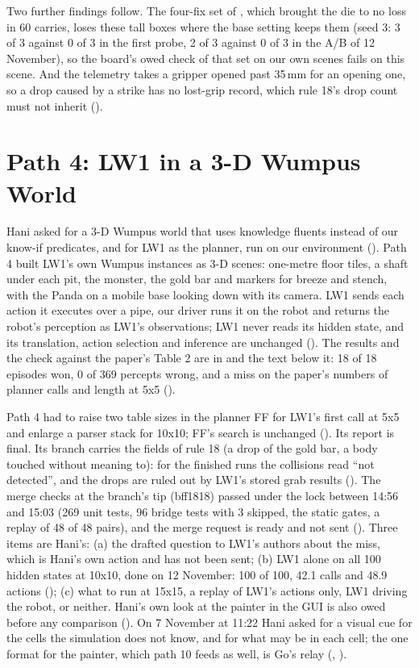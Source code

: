 Two further findings follow. The four-fix set of , which brought the die to no
loss in 60 carries, loses these tall boxes where the base setting keeps them (seed 3:
3 of 3 against 0 of 3 in the first probe, 2 of 3 against 0 of 3 in the A/B of 12
November), so the board's owed check of that set on our own scenes fails
on this scene. And the telemetry takes a gripper opened past 35\,mm for an opening
one, so a drop caused by a strike has no lost-grip record, which rule 18's drop count
must not inherit ().

\section{Path 4: LW1 in a 3-D Wumpus World}
\label{sec:path4}

Hani asked for a 3-D Wumpus world that uses knowledge fluents instead of our
know-if predicates, and for LW1 as the planner, run on our environment (). Path
4 built LW1's own Wumpus instances as 3-D scenes: one-metre floor tiles, a shaft under
each pit, the monster, the gold bar and markers for breeze and stench, with the
Panda on a mobile base looking down with its camera. LW1 sends each action it
executes over a pipe, our driver runs it on the robot and returns the robot's
perception as LW1's observations; LW1 never reads its hidden state, and its
translation, action selection and inference are unchanged (). The results and
the check against the paper's Table 2 are in  and the text
below it: 18 of 18 episodes won, 0 of 369 percepts wrong, and a miss on the paper's
numbers of planner calls and length at 5x5 ().

Path 4 had to raise two table sizes in the planner FF for LW1's first call at 5x5
and enlarge a parser stack for 10x10; FF's search is unchanged (). Its report
is final. Its branch carries the fields of rule 18 (a drop of the gold bar, a body
touched without meaning to): for the finished runs the collisions read ``not
detected'', and the drops are ruled out by LW1's stored grab results (). The
merge checks at the branch's tip (bff1818) passed under the lock between 14:56 and
15:03 (269 unit tests, 96 bridge tests with 3 skipped, the static gates, a replay of 48
of 48 pairs), and the merge request is ready and not sent (). Three items are
Hani's: (a) the drafted question to LW1's authors about the miss, which is Hani's own
action and has not been sent; (b) LW1 alone on all 100 hidden states at 10x10, done on
12 November: 100 of 100, 42.1 calls and 48.9 actions (); (c) what
to run at 15x15, a replay of LW1's actions only, LW1 driving the robot, or neither.
Hani's own look at the painter in the GUI is also owed before any comparison
(). On 7 November at 11:22 Hani asked for a visual cue for the cells the
simulation does not know, and for what may be in each cell; the one format for the
painter, which path 10 feeds as well, is Go's relay (, ).

